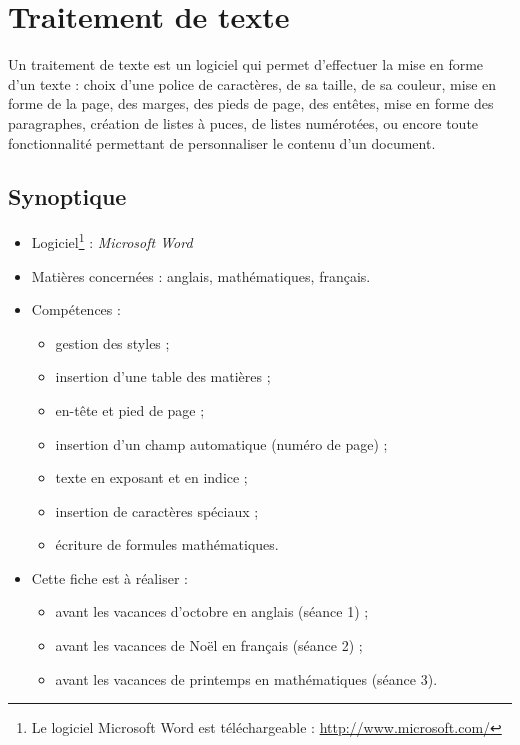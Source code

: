 \chapter{Traitement de texte}  

Un traitement de texte est un logiciel qui permet d'effectuer la mise en forme d'un texte : choix d'une police de caractères, de sa taille, de sa couleur, mise en forme de la page, des marges, des pieds de page, des entêtes, mise en forme des paragraphes, création de listes à puces, de listes numérotées, ou encore toute fonctionnalité permettant de personnaliser le contenu d'un document.\\

\section*{Synoptique}

\begin{itemize}
\item Logiciel\footnote{Le logiciel Microsoft Word est téléchargeable : \url{http://www.microsoft.com/}} : \emph{Microsoft Word} 
\item Matières concernées : anglais, mathématiques, français.
\item Compétences : 
        \begin{itemize}
        \item gestion des styles ;
	\item insertion d'une table des matières ;
	\item en-tête et pied de page ;
	\item insertion d'un champ automatique (numéro de page) ;
	\item texte en exposant et en indice ;
	\item insertion de caractères spéciaux ; 
	\item écriture de formules mathématiques.
        \end{itemize}
\item Cette fiche est à réaliser :
        \begin{itemize}
        \item avant les vacances d'octobre en anglais (séance 1) ;
	\item avant les vacances de Noël en français (séance 2) ;
        \item avant les vacances de printemps en mathématiques (séance 3).     
        \end{itemize}
\end{itemize}





